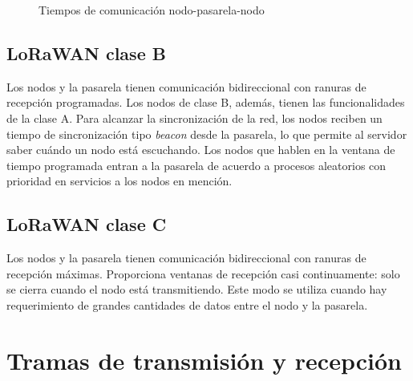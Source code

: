 \begin{figure}[H]
  \centering
  \caption{Tiempos de comunicación nodo-pasarela-nodo}\label{f:retardo}
  \propia
\end{figure}

\subsection{LoRaWAN clase B}

Los nodos y la pasarela tienen comunicación bidireccional con ranuras de recepción programadas. Los nodos de clase B, además, tienen las funcionalidades de la clase A. Para alcanzar la sincronización de la red, los nodos reciben un tiempo de sincronización tipo \emph{beacon} desde la pasarela, lo que permite al servidor saber cuándo un nodo está escuchando. Los nodos que hablen en la ventana de tiempo programada entran a la pasarela de acuerdo a procesos aleatorios con prioridad en servicios a los nodos en mención.

\subsection{LoRaWAN clase C}

Los nodos y la pasarela tienen comunicación bidireccional con ranuras de recepción máximas. Proporciona ventanas de recepción casi continuamente: solo se cierra cuando el nodo está transmitiendo. Este modo se utiliza cuando hay requerimiento de grandes cantidades de datos entre el nodo y la pasarela.

\section{Tramas de transmisión y recepción}

